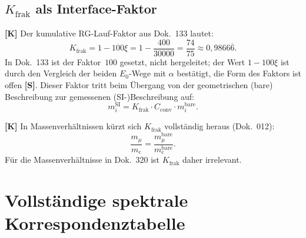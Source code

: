 \subsection{$K_{\mathrm{frak}}$ als Interface-Faktor}

\textbf{[K]} Der kumulative RG-Lauf-Faktor aus Dok.~133 lautet:
\begin{equation}
  K_{\mathrm{frak}} = 1 - 100\xi = 1 - \frac{400}{30000}
  = \frac{74}{75} \approx 0{,}9866\overline{6}.
  \label{eq:Kfrak}
\end{equation}
In Dok.~133 ist der Faktor~$100$ gesetzt, nicht hergeleitet; der Wert
$1-100\xi$ ist durch den Vergleich der beiden $E_0$-Wege mit $\alpha$
bestätigt, die Form des Faktors ist offen \textbf{[S]}.
Dieser Faktor tritt beim Übergang von der geometrischen (bare)
Beschreibung zur gemessenen (SI-)Beschreibung auf:
\begin{equation}
  m_i^{\mathrm{SI}} = K_{\mathrm{frak}} \cdot C_{\mathrm{conv}}
  \cdot m_i^{\mathrm{bare}}.
  \label{eq:Kumrech}
\end{equation}

\textbf{[K]} In Massenverhältnissen kürzt sich $K_{\mathrm{frak}}$
vollständig heraus (Dok.~012):
\begin{equation}
  \frac{m_\mu}{m_e} = \frac{m_\mu^{\mathrm{bare}}}{m_e^{\mathrm{bare}}}.
  \label{eq:verh}
\end{equation}
Für die Massenverhältnisse in Dok.~320 ist $K_{\mathrm{frak}}$
daher irrelevant.

\section{Vollständige spektrale Korrespondenztabelle}

